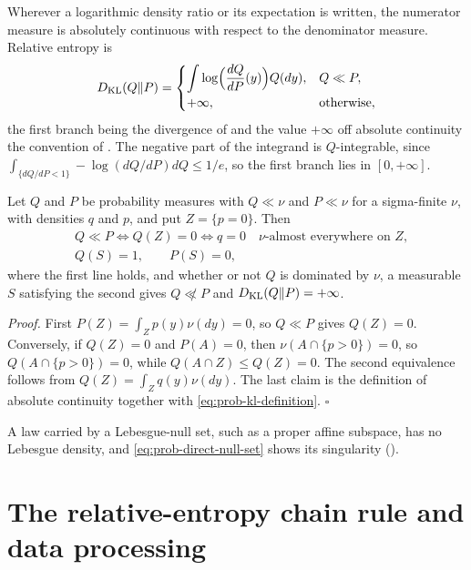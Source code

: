 Wherever a logarithmic density ratio or its expectation is written, the numerator measure is absolutely
continuous with respect to the denominator measure. Relative entropy is
\begin{equation}
D_{\mathrm{KL}}(Q\Vert P)=
\begin{cases}
\displaystyle\int\log\Bigl(\frac{dQ}{dP}(y)\Bigr)Q(dy), & Q\ll P,\\[1.2ex]
+\infty, & \text{otherwise},
\end{cases}
\label{eq:prob-kl-definition}
\end{equation}
the first branch being the divergence of \citet{Kullback1951} and the value $+\infty$ off absolute
continuity the convention of \citet{Csiszar1967}. The negative part of the integrand is $Q$-integrable,
since $\int_{\{dQ/dP<1\}}-\log(dQ/dP)dQ\leq1/e$, so the first branch lies in $[0,+\infty]$.

Let $Q$ and $P$ be probability measures with $Q\ll\nu$ and $P\ll\nu$ for a sigma-finite $\nu$, with
densities $q$ and $p$, and put $Z=\{p=0\}$. Then
\begin{align}
&Q\ll P
\iff
Q(Z)=0
\iff
q=0\quad\nu\text{-almost everywhere on }Z,
\label{eq:prob-abscont-criterion}\\
&Q(S)=1,
\qquad
P(S)=0,
\label{eq:prob-direct-null-set}
\end{align}
where the first line holds, and whether or not $Q$ is dominated by $\nu$, a measurable $S$ satisfying the
second gives $Q\not\ll P$ and $D_{\mathrm{KL}}(Q\Vert P)=+\infty$. 

\noindent\emph{Proof.}
First $P(Z)=\int_Zp(y)\nu(dy)=0$, so $Q\ll P$ gives $Q(Z)=0$. Conversely, if $Q(Z)=0$ and $P(A)=0$, then
$\nu(A\cap\{p>0\})=0$, so $Q(A\cap\{p>0\})=0$, while $Q(A\cap Z)\leq Q(Z)=0$. The second equivalence
follows from $Q(Z)=\int_Zq(y)\nu(dy)$. The last claim is the definition of absolute continuity together with
\eqref{eq:prob-kl-definition}. \hfill$\square$

A law carried by a Lebesgue-null set, such as a proper affine subspace, has no Lebesgue density, and
\eqref{eq:prob-direct-null-set} shows its singularity ().

\section{The relative-entropy chain rule and data processing}
\label{sec:prob-kl-chain-rule}

